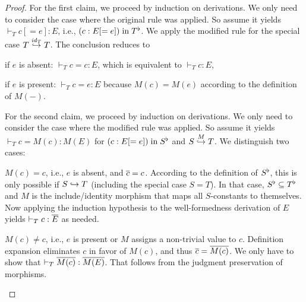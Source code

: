\begin{proof}
For the first claim, we proceed by induction on derivations.
We only need to consider the case where the original rule was applied.
So assume it yields $\vdash_T c[=e]:E$, i.e., $(c:E[=e]) \minn \flt{T}$.
We apply the modified rule for the special case $\ipc{\id{T}}{T}{T}$.
The conclusion reduces to
\begin{compactitem}
 \item if $e$ is absent: $\vdash_T c=c:E$, which is equivalent to $\vdash_T c:E$,
 \item if $e$ is present: $\vdash_T c=e:E$ because $M(c)=M(e)$ according to the definition of $M(-)$.
\end{compactitem}

For the second claim, we proceed by induction on derivations.
We only need to consider the case where the modified rule was applied.
So assume it yields $\vdash_T c=M(c):M(E)$ for $(c:E[=e]) \minn \flt{S}$ and $\ipc{M}{S}{T}$.
We distinguish two cases:
\begin{compactitem}
 \item $M(c)=c$, i.e., $e$ is absent, and $\ov{c}=c$.
   According to the definition of $\flt{S}$, this is only possible if $S\harr T$ (including the special case $S=T$).
   In that case, $\flt{S}\sq\flt{T}$ and $M$ is the include/identity morphism that maps all $S$-constants to themselves.
   Now applying the induction hypothesis to the well-formedness derivation of $E$ yields $\vdash_T c:\ov{E}$ as needed.
 \item $M(c)\neq c$, i.e., $e$ is present or $M$ assigns a non-trivial value to $c$.
  Definition expansion eliminates $c$ in favor of $M(c)$, and thus $\ov{c}=\ov{M(c)}$.
  We only have to show that $\vdash_T \ov{M(c)}:\ov{M(E)}$. That follows from the judgment preservation of morphisms.
\end{compactitem}
\end{proof}

